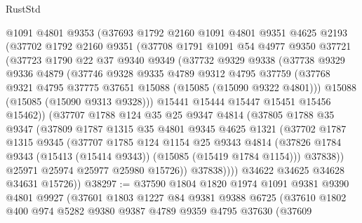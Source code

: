 \begin{lexlean}{RustStd}
\begin{coremodule}
      @1091
      @4801
      @9353
      (@37693
        @1792
        @2160
        @1091
        @4801
        @9351
        @4625
        @2193
        (@37702
          @1792
          @2160
          @9351
          (@37708
            @1791
            @1091
            @54
            @4977
            @9350
            @37721
            (@37723
              @1790
              @22
              @37
              @9340
              @9349
              (@37732
                @9329
                @9338
                (@37738
                  @9329
                  @9336
                  @4879
                  (@37746
                    @9328
                    @9335
                    @4789
                    @9312
                    @4795
                    @37759
                    (@37768 @9321 @4795 @37775 @37651 @15088 (@15085 (@15090 @9322 @4801)))
                    @15088
                    (@15085 (@15090 @9313 @9328)))
                  @15441
                  @15444
                  @15447
                  @15451
                  @15456
                  @15462))
              (@37707
                @1788
                @124
                @35
                @25
                @9347
                @4814
                (@37805
                  @1788
                  @35
                  @9347
                  (@37809
                    @1787
                    @1315
                    @35
                    @4801
                    @9345
                    @4625
                    @1321
                    (@37702
                      @1787
                      @1315
                      @9345
                      (@37707
                        @1785
                        @124
                        @1154
                        @25
                        @9343
                        @4814
                        (@37826 @1784 @9343 (@15413 (@15414 @9343)) (@15085 (@15419 @1784 @1154)))
                        @37838))
                    @25971
                    @25974
                    @25977
                    @25980
                    @15726))
                @37838))))
        @34622
        @34625
        @34628
        @34631
        @15726))
@38297 := @37590
    @1804
    @1820
    @1974
    @1091
    @9381
    @9390
    @4801
    @9927
    (@37601
      @1803
      @1227
      @84
      @9381
      @9388
      @6725
      (@37610
        @1802
        @400
        @974
        @5282
        @9380
        @9387
        @4789
        @9359
        @4795
        @37630
        (@37609

\end{coremodule}
\end{lexlean}
